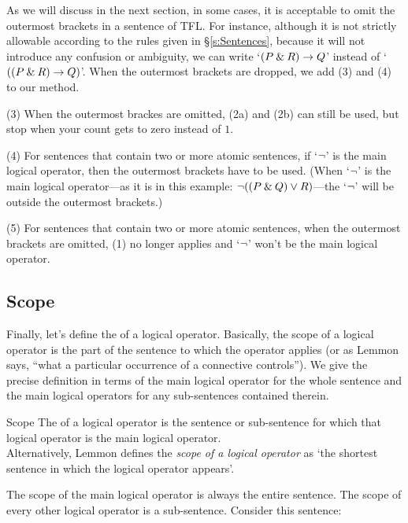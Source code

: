 As we will discuss in the next section, in some cases, it is acceptable to omit the outermost brackets in a sentence of TFL. For instance, although it is not strictly allowable according to the rules given in \S\ref{s:Sentences}, because it will not introduce any confusion or ambiguity, we can write `$(P \mathbin{\&} R) \rightarrow Q$' instead of `$((P \mathbin{\&} R) \rightarrow Q)$'. When the outermost brackets are dropped, we add (3) and (4) to our method.

\begin{ebullet}
\item[(3)] When the outermost brackes are omitted, (2a) and (2b) can still be used, but stop when your count gets to zero instead of $1$.
\item[(4)] For sentences that contain two or more atomic sentences, if `${\neg}$' is the main logical operator, then the outermost brackets have to be used. (When `${\neg}$' is the main logical operator---as it is in this example: ${\neg}((P \mathbin{\&} Q) \vee R)$---the `${\neg}$' will be outside the outermost brackets.) 
\item[(5)] For sentences that contain two or more atomic sentences, when the outermost brackets are omitted, (1) no longer applies and `${\neg}$' won't be the main logical operator. 
\end{ebullet}


\subsection{Scope}

Finally, let's define the  of a logical operator. Basically, the scope of a logical operator is the part of the sentence to which the operator applies (or as Lemmon says, ``what a particular occurrence of a connective controls''). We give the precise definition in terms of the main logical operator for the whole sentence and the main logical operators for any sub-sentences contained therein. 

\begin{factboxy}{Scope}
The  of a logical operator is the sentence or sub-sentence for which that logical operator is the main logical operator.\\
Alternatively, Lemmon defines the \textit{scope of a logical operator} as `the shortest sentence in which the logical operator appears'.
\end{factboxy}

The scope of the main logical operator is always the entire sentence. The scope of every other logical operator is a sub-sentence. Consider this sentence:

